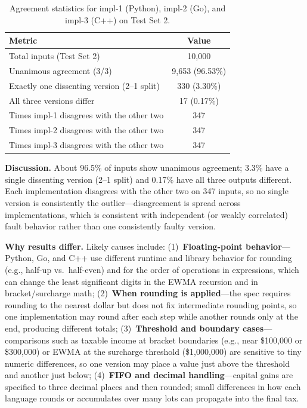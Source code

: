 \begin{table}[h]
\centering
\begin{tabular}{lc}
\toprule
Metric & Value \\
\midrule
Total inputs (Test Set 2) & 10{,}000 \\
Unanimous agreement (3/3) & 9{,}653 (96.53\%) \\
Exactly one dissenting version (2--1 split) & 330 (3.30\%) \\
All three versions differ & 17 (0.17\%) \\
Times impl-1 disagrees with the other two & 347 \\
Times impl-2 disagrees with the other two & 347 \\
Times impl-3 disagrees with the other two & 347 \\
\bottomrule
\end{tabular}
\caption{Agreement statistics for impl-1 (Python), impl-2 (Go), and impl-3 (C++) on Test Set 2.}
\label{tab:agreement}
\end{table}

\textbf{Discussion.}
About 96.5\% of inputs show unanimous agreement; 3.3\% have a single dissenting version (2--1 split) and 0.17\% have all three outputs different.
Each implementation disagrees with the other two on 347 inputs, so no single version is consistently the outlier---disagreement is spread across implementations, which is consistent with independent (or weakly correlated) fault behavior rather than one consistently faulty version.

\textbf{Why results differ.}
Likely causes include: (1)~\textbf{Floating-point behavior}---Python, Go, and C++ use different runtime and library behavior for rounding (e.g., half-up vs.\ half-even) and for the order of operations in expressions, which can change the least significant digits in the EWMA recursion and in bracket/surcharge math; (2)~\textbf{When rounding is applied}---the spec requires rounding to the nearest dollar but does not fix intermediate rounding points, so one implementation may round after each step while another rounds only at the end, producing different totals; (3)~\textbf{Threshold and boundary cases}---comparisons such as taxable income at bracket boundaries (e.g., near \$100{,}000 or \$300{,}000) or EWMA at the surcharge threshold (\$1{,}000{,}000) are sensitive to tiny numeric differences, so one version may place a value just above the threshold and another just below; (4)~\textbf{FIFO and decimal handling}---capital gains are specified to three decimal places and then rounded; small differences in how each language rounds or accumulates over many lots can propagate into the final tax.

